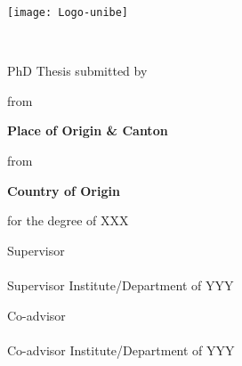 \documentclass[
10pt, %
english, %
singlespacing, %
headsepline, %
]{MastersDoctoralThesis} %
\author{\textsc{Surname} FirstName} %
\begin{document}
\frontmatter %

\pagestyle{plain} %


\begin{titlepage}

\hfill{\texttt{[image: Logo-unibe]}}

\begin{center}

\vspace*{0.5cm}
{\Large \facname \\ \textsc{\univname} \par}\vspace{1cm} %

{\huge \bfseries \ttitle\par}\vspace{1cm} %


\large{PhD Thesis submitted by}\vspace{0.5cm}

{\Large \bfseries \authorname \par}\vspace{0.5cm}

\large{from }{\Large \bfseries Place of Origin & Canton \par}\vspace{0.5cm}

\large{from }{\Large \bfseries Country of Origin \par}\vspace{0.5cm}

\large{for the degree of XXX}\vspace{0.5cm}
 
\vfill

\large{Supervisor \\ \supname \\ Supervisor Institute/Department of YYY}\vspace{0.5cm}

\large{Co-advisor \\ \examname \\  Co-advisor Institute/Department of YYY}\vspace{0.5cm}

\end{center}
\end{titlepage}
\cleardoublepage
\end{document}
